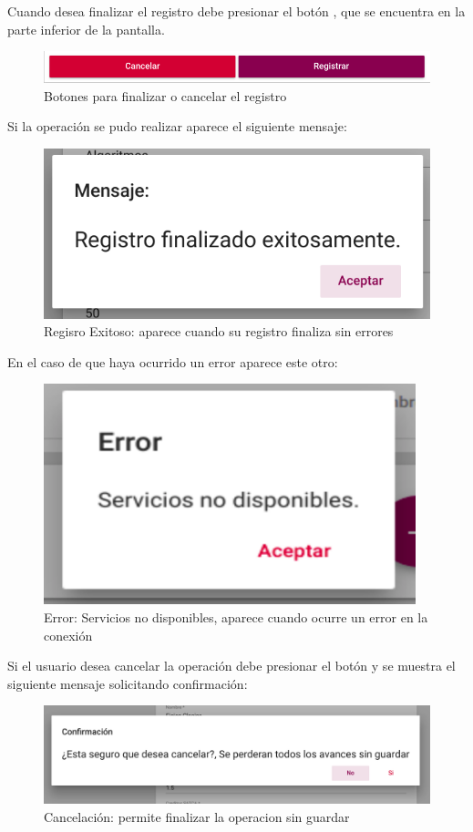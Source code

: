 Cuando desea finalizar el registro debe presionar el botón , que se encuentra en la parte inferior de la pantalla.\\
\begin{figure}[H]
    \centering
    \hypertarget{registrarBtnR}{\includegraphics[width=0.7\linewidth]{images/GUA/registrarBtn}}
    \caption{Botones para finalizar o cancelar el registro}
    \label{registrarBtnR}
\end{figure}
Si la operación se pudo realizar aparece el siguiente mensaje:\\
\begin{figure}[H]
    \centering
    \hypertarget{exito}{\includegraphics[width=0.7\linewidth]{images/GUA/exito}}
    \caption{Regisro Exitoso: aparece cuando su registro finaliza sin errores}
    \label{exito}
\end{figure}
En el caso de que haya ocurrido un error aparece este otro:\\
\begin{figure}[H]
    \centering
    \hypertarget{errorR}{\includegraphics[width=0.7\linewidth]{images/GUA/error}}
    \caption{Error: Servicios no disponibles, aparece cuando ocurre un error en la conexión}
    \label{errorR}
\end{figure}
Si el usuario desea cancelar la operación debe presionar el botón  y se muestra el siguiente mensaje solicitando confirmación:\\
\begin{figure}[H]
    \centering
    \hypertarget{cancelarR}{\includegraphics[width=0.7\linewidth]{images/GUA/cancelar}}
    \caption{Cancelación: permite finalizar la operacion sin guardar}
    \label{cancelarR}
\end{figure}
\newpage
